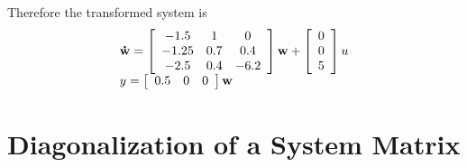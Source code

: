 Therefore the transformed system is
\[
\begin{array}{l}
 {\bf{\dot w}} = \left[ {\begin{array}{*{20}c}
   { - 1.5} & 1 & 0  \\
   { - 1.25} & {0.7} & {0.4}  \\
   { - 2.5} & { 0.4} & {-6.2}  \\
\end{array}} \right]{\bf{w}} + \left[ {\begin{array}{*{20}c}
   0  \\
   0  \\
   5  \\
\end{array}} \right]u \\ 
 y = \left[ {\begin{array}{*{20}c}
   {0.5} & 0 & 0  \\
\end{array}} \right]{\bf{w}} \\ 
 \end{array}
\]


 
\section*{Diagonalization of a System Matrix} %
\label{sec:diagonalization_of_a_system_matrix}

